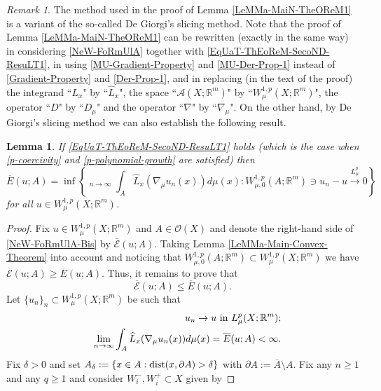 \documentclass[10pt]{amsart}
\numberwithin{equation}{section}
\newtheorem{lemma}[theorem]{Lemma}
\theoremstyle{definition}
\theoremstyle{remark}
\newtheorem{remark}[theorem]{Remark}
\begin{document}
\begin{remark}
The method used in the proof of Lemma \ref{LeMMa-MaiN-TheOReM1} is a variant of the so-called De Giorgi's slicing method. Note that the proof of Lemma \ref{LeMMa-MaiN-TheOReM1} can be rewritten (exactly in the same way) in considering \eqref{NeW-FoRmUlA} together with \eqref{EqUaT-ThEoReM-SecoND-ResuLT1}, in using \eqref{MU-Gradient-Property} and \eqref{MU-Der-Prop-1} instead of \eqref{Gradient-Property} and \eqref{Der-Prop-1}, and in replacing (in the text of the proof) the integrand ``$L_x$" by ``$\widehat{L}_x$", the space ``$\mathcal{A}(X;{{\mathbb R}}^m)$" by ``$W^{1,p}_\mu(X;{{\mathbb R}}^m)$", the operator ``$D$" by ``$D_\mu$" and the operator ``$\nabla$" by ``$\nabla_\mu$". On the other hand, by De Giorgi's slicing method we can also establish the following result.
\begin{lemma}\label{AddiTiONaL-LEMma}
If \eqref{EqUaT-ThEoReM-SecoND-ResuLT1} holds (which is the case when \eqref{p-coercivity} and \eqref{p-polynomial-growth} are satisfied) then 
\begin{equation}\label{NeW-FoRmUlA-Bis}
\overline{E}(u;A)=\inf\left\{{\mathop{\underline{\lim}}}_{n\to\infty}\int_A\widehat{L}_x(\nabla_\mu u_n(x))d\mu(x):W^{1,p}_{\mu,0}(A;{{\mathbb R}}^m)\ni u_n-u\stackrel{L^p_\mu}{\to} 0\right\}
\end{equation}
for all $u\in W^{1,p}_\mu(X;{{\mathbb R}}^m)$. 
\end{lemma}
\begin{proof}
Fix $u\in W^{1,p}_\mu(X;{{\mathbb R}}^m)$ and $A\in\mathcal{O}(X)$ and denote the right-hand side of \eqref{NeW-FoRmUlA-Bis} by $\overline{\mathcal{E}}(u;A)$. Taking Lemma \ref{LeMMa-Main-Convex-Theorem} into account and noticing that $W^{1,p}_{\mu,0}(A;{{\mathbb R}}^m)\subset W^{1,p}_\mu(X;{{\mathbb R}}^m)$ we have $\overline{\mathcal{E}}(u;A)\geq\overline{E}(u;A)$. Thus, it remains to prove that
\begin{equation}\label{GOal-Lemma-Bis}
\overline{\mathcal{E}}(u;A)\leq\overline{E}(u;A).
\end{equation}
Let $\{u_n\}_n\subset W^{1,p}_\mu(X;{{\mathbb R}}^m)$ be such that
\begin{eqnarray}
&& u_n\to u\hbox{ in }L^p_\mu(X;{{\mathbb R}}^m)\label{PrOoF-MT2-EquA1-BiS};\\
&& \lim_{n\to\infty}\int_A\widehat{L}_x(\nabla_\mu u_n(x))d\mu(x)=\overline{E}(u;A)<\infty.\label{PrOoF-MT2-EquA3-BiS}
\end{eqnarray}
Fix $\delta>0$ and set $A_\delta:=\{x\in A:{\rm dist}(x,\partial A)>\delta\}$ with $\partial A:=\overline{A}\setminus A$. Fix any $n\geq 1$ and any $q\geq 1$ and consider $W^-_i,W^+_i\subset X$ given by

\end{proof}
\end{remark}
\end{document}
